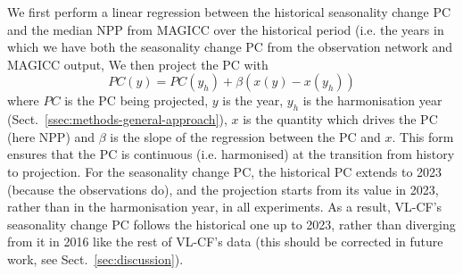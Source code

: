 We first perform a linear regression between the historical seasonality change PC and the median NPP from MAGICC
over the historical period
(i.e. the years in which we have both the seasonality change PC from the observation network and MAGICC output,
We then project the PC with
\begin{equation}
    \label{eq:pc-projection}
    PC(y) = PC(y_h) + \beta \left( x(y) - x(y_h) \right)
\end{equation}
where $PC$ is the PC being projected,
$y$ is the year,
$y_h$ is the harmonisation year (Sect.~\ref{ssec:methods-general-approach}),
$x$ is the quantity which drives the PC (here NPP)
and $\beta$ is the slope of the regression between the PC and $x$.
This form ensures that the PC is continuous (i.e. harmonised) at the transition from history to projection.
For the seasonality change PC, the historical PC extends to 2023 (because the observations do),
and the projection starts from its value in 2023, rather than in the harmonisation year, in all experiments.
As a result, VL-CF's seasonality change PC follows the historical one up to 2023,
rather than diverging from it in 2016 like the rest of VL-CF's data
(this should be corrected in future work, see Sect.~\ref{sec:discussion}).

